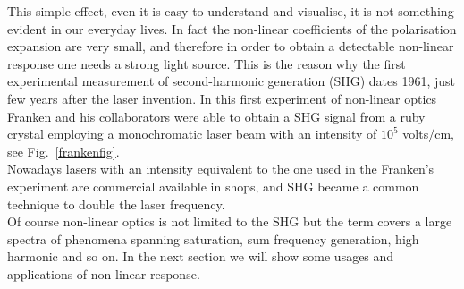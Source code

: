 This simple effect, even it is easy to understand and visualise, it is not something evident in our everyday lives. In fact the non-linear coefficients of the polarisation expansion are very small, and therefore in order to obtain a detectable non-linear response one needs a strong light source. This is the reason why the first experimental measurement of second-harmonic generation (SHG) dates 1961\cite{franken1961generation}, just few years after the laser invention.\cite{maiman1960stimulated} In this first experiment of non-linear optics Franken and his collaborators were able to obtain a SHG signal from a ruby crystal employing a monochromatic laser beam with an intensity of $10^5$ volts/cm, see Fig.~\ref{frankenfig}.\\
Nowadays lasers with an intensity equivalent to the one used in the Franken's experiment are commercial available in shops, and SHG became a common technique to double the laser frequency.\\
Of course non-linear optics is not limited to the SHG but the term covers a large spectra of phenomena spanning saturation, sum frequency generation, high harmonic and so on. In the next section we will show some usages and applications of non-linear response.
